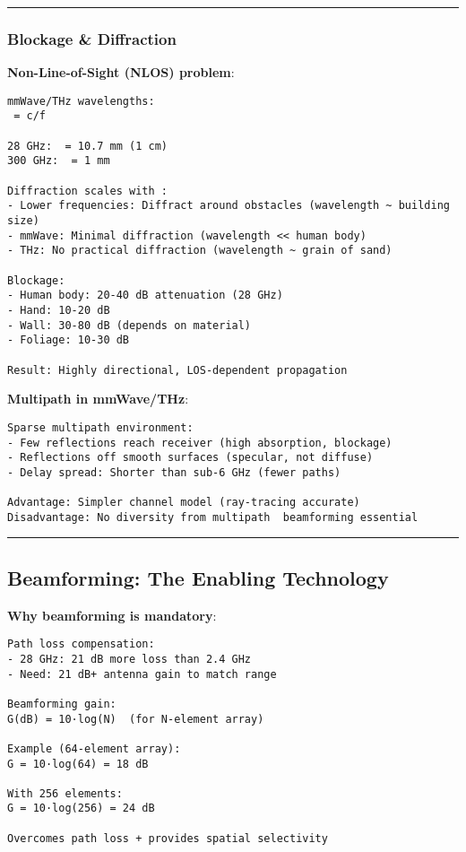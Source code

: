 \begin{center}\rule{0.5\linewidth}{0.5pt}\end{center}

\subsubsection{Blockage \& Diffraction}\label{blockage-diffraction}

\textbf{Non-Line-of-Sight (NLOS) problem}:

\begin{verbatim}
mmWave/THz wavelengths:
 = c/f

28 GHz:  = 10.7 mm (1 cm)
300 GHz:  = 1 mm

Diffraction scales with :
- Lower frequencies: Diffract around obstacles (wavelength ~ building size)
- mmWave: Minimal diffraction (wavelength << human body)
- THz: No practical diffraction (wavelength ~ grain of sand)

Blockage:
- Human body: 20-40 dB attenuation (28 GHz)
- Hand: 10-20 dB
- Wall: 30-80 dB (depends on material)
- Foliage: 10-30 dB

Result: Highly directional, LOS-dependent propagation
\end{verbatim}

\textbf{Multipath in mmWave/THz}:

\begin{verbatim}
Sparse multipath environment:
- Few reflections reach receiver (high absorption, blockage)
- Reflections off smooth surfaces (specular, not diffuse)
- Delay spread: Shorter than sub-6 GHz (fewer paths)

Advantage: Simpler channel model (ray-tracing accurate)
Disadvantage: No diversity from multipath  beamforming essential
\end{verbatim}

\begin{center}\rule{0.5\linewidth}{0.5pt}\end{center}

\subsection{\texorpdfstring{ Beamforming: The Enabling
Technology}{ Beamforming: The Enabling Technology}}\label{beamforming-the-enabling-technology}

\textbf{Why beamforming is mandatory}:

\begin{verbatim}
Path loss compensation:
- 28 GHz: 21 dB more loss than 2.4 GHz
- Need: 21 dB+ antenna gain to match range

Beamforming gain:
G(dB) = 10·log(N)  (for N-element array)

Example (64-element array):
G = 10·log(64) = 18 dB

With 256 elements:
G = 10·log(256) = 24 dB

Overcomes path loss + provides spatial selectivity
\end{verbatim}


